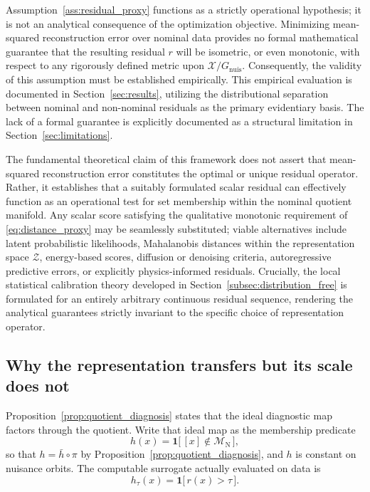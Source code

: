 \documentclass[a4paper]{cas-sc}
\newcommand{\Z}{\ensuremath{\mathcal{Z}}}
\newcommand{\Mnominal}{\ensuremath{\mathcal{M}_{\mathrm{N}}}}
\newcommand{\quotient}{\ensuremath{\mathcal{X}/G_{\mathrm{nuis}}}}
\newcommand{\residual}{\ensuremath{r}}
\newcommand{\indicator}{\ensuremath{\mathbf{1}}}
\begin{document}
Assumption~\ref{ass:residual_proxy} functions as a strictly operational hypothesis; it is not an analytical consequence of the optimization objective. Minimizing mean-squared reconstruction error over nominal data provides no formal mathematical guarantee that the resulting residual \(\residual\) will be isometric, or even monotonic, with respect to any rigorously defined metric upon \(\quotient\). Consequently, the validity of this assumption must be established empirically. This empirical evaluation is documented in Section~\ref{sec:results}, utilizing the distributional separation between nominal and non-nominal residuals as the primary evidentiary basis. The lack of a formal guarantee is explicitly documented as a structural limitation in Section~\ref{sec:limitations}.

The fundamental theoretical claim of this framework does not assert that mean-squared reconstruction error constitutes the optimal or unique residual operator. Rather, it establishes that a suitably formulated scalar residual can effectively function as an operational test for set membership within the nominal quotient manifold. Any scalar score satisfying the qualitative monotonic requirement of \eqref{eq:distance_proxy} may be seamlessly substituted; viable alternatives include latent probabilistic likelihoods, Mahalanobis distances within the representation space \(\Z\), energy-based scores, diffusion or denoising criteria, autoregressive predictive errors, or explicitly physics-informed residuals. Crucially, the local statistical calibration theory developed in Section~\ref{subsec:distribution_free} is formulated for an entirely arbitrary continuous residual sequence, rendering the analytical guarantees strictly invariant to the specific choice of representation operator.

\subsection{Why the representation transfers but its scale does not}
\label{subsec:scale_transfer}

Proposition~\ref{prop:quotient_diagnosis} states that the ideal diagnostic
map factors through the quotient. Write that ideal map as the membership
predicate
\begin{equation}
h(x) = \indicator\bigl[\,[x]\notin\Mnominal\,\bigr],
\label{eq:ideal_predicate}
\end{equation}
so that \(h=\bar h\circ\pi\) by Proposition~\ref{prop:quotient_diagnosis},
and \(h\) is constant on nuisance orbits. The computable surrogate actually
evaluated on data is
\begin{equation}
h_\tau(x) = \indicator\bigl[\,\residual(x) > \tau\,\bigr].
\label{eq:surrogate_predicate}
\end{equation}
\end{document}
